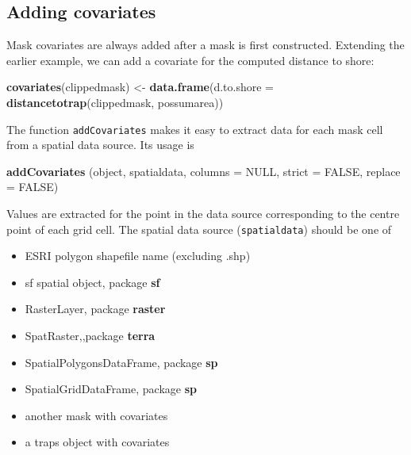 \documentclass[
]{book}
\newenvironment{Shaded}{\begin{snugshade}}{\end{snugshade}}
\newcommand{\AttributeTok}[1]{\textcolor[rgb]{0.13,0.29,0.53}{#1}}
\newcommand{\ConstantTok}[1]{\textcolor[rgb]{0.56,0.35,0.01}{#1}}
\newcommand{\FunctionTok}[1]{\textcolor[rgb]{0.13,0.29,0.53}{\textbf{#1}}}
\newcommand{\NormalTok}[1]{#1}
\newcommand{\OtherTok}[1]{\textcolor[rgb]{0.56,0.35,0.01}{#1}}
\providecommand{\tightlist}{%
  \setlength{\itemsep}{0pt}\setlength{\parskip}{0pt}}
\begin{document}
\subsection{Adding covariates}\label{adding-covariates}

Mask covariates are always added after a mask is first constructed. Extending the earlier example, we can add a covariate for the computed distance to shore:

\begin{Shaded}
\begin{Highlighting}[]
\FunctionTok{covariates}\NormalTok{(clippedmask) }\OtherTok{\textless{}{-}} \FunctionTok{data.frame}\NormalTok{(}\AttributeTok{d.to.shore =} 
    \FunctionTok{distancetotrap}\NormalTok{(clippedmask, possumarea))}
\end{Highlighting}
\end{Shaded}

The function \texttt{addCovariates} makes it easy to extract data for each mask cell from a spatial data source. Its usage is

\begin{Shaded}
\begin{Highlighting}[]
\FunctionTok{addCovariates}\NormalTok{ (object, spatialdata, }\AttributeTok{columns =} \ConstantTok{NULL}\NormalTok{, }
    \AttributeTok{strict =} \ConstantTok{FALSE}\NormalTok{, }\AttributeTok{replace =} \ConstantTok{FALSE}\NormalTok{)}
\end{Highlighting}
\end{Shaded}

Values are extracted for the point in the data source corresponding to the centre point of each grid cell. The spatial data source (\texttt{spatialdata}) should be one of

\begin{itemize}
\tightlist
\item
  ESRI polygon shapefile name (excluding .shp)
\item
  sf spatial object, package \textbf{sf} \citep{R-sf}
\item
  RasterLayer, package \textbf{raster} \citep{R-raster}
\item
  SpatRaster,,package \textbf{terra} \citep{R-terra}
\item
  SpatialPolygonsDataFrame, package \textbf{sp} \citep{R-sp}
\item
  SpatialGridDataFrame, package \textbf{sp}
\item
  another mask with covariates
\item
  a traps object with covariates
\end{itemize}
\end{document}
